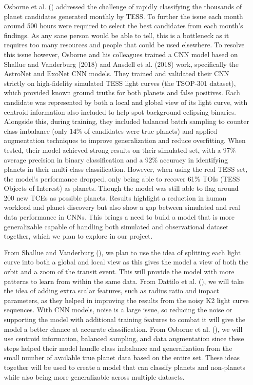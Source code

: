 \documentclass[letterpaper]{article} %
\begin{document}
Osborne et al. (\citeyear{Osborn2019rapidclassificationtesscandidates}) addressed the challenge of rapidly classifying the thousands of planet candidates generated monthly by TESS. To further the issue each month around 500 hours were required to select the best candidates from each month's findings. As any sane person would be able to tell, this is a bottleneck as it requires too many resources and people that could be used elsewhere. To resolve this issue however, Osborne and his colleagues trained a CNN model based on Shallue and Vanderburg (2018) and Ansdell et al. (2018) work, specifically the AstroNet and ExoNet CNN models. They trained and validated their CNN strictly on high-fidelity simulated TESS light curves (the TSOP-301 dataset), which provided known ground truths for both planets and false positives. Each candidate was represented by both a local and global view of its light curve, with centroid information also included to help spot background eclipsing binaries. Alongside this, during training, they included balanced batch sampling to counter class imbalance (only 14\% of candidates were true planets) and applied augmentation techniques to improve generalization and reduce overfitting. When tested, their model achieved strong results on their simulated set, with a 97\% average precision in binary classification and a 92\% accuracy in identifying planets in their multi-class classification. However, when using the real TESS set, the model’s performance dropped, only being able to recover 61\% TOIs (TESS Objects of Interest) as planets. Though the model was still able to flag around 200 new TCEs as possible planets. Results highlight a reduction in human workload and planet discovery but also show a gap between simulated and real data performance in CNNs. This brings a need to build a model that is more generalizable capable of handling both simulated and observational dataset together, which we plan to explore in our project.

From Shallue and Vanderburg (\citeyear{Shallue2018identifyexoplanetsI}), we plan to use the idea of splitting each light curve into both a global and local view as this gives the model a view of both the orbit and a zoom of the transit event. This will provide the model with more patterns to learn from within the same data. From Dattilo et al. (\citeyear{Dattilo2019identifyexoplanetsII}), we will take the idea of adding extra scalar features, such as radius ratio and impact parameters, as they helped in improving the results from the noisy K2 light curve sequences. With CNN models, noise is a large issue, so reducing the noise or supporting the model with additional training features to combat it will give the model a better chance at accurate classification. From Osborne et al. (\citeyear{Osborn2019rapidclassificationtesscandidates}), we will use centroid information, balanced sampling, and data augmentation since these steps helped their model handle class imbalance and generalization from the small number of available true planet data based on the entire set. These ideas together will be used to create a model that can classify planets and non-planets while also being more generalizable across multiple datasets.
\end{document}
